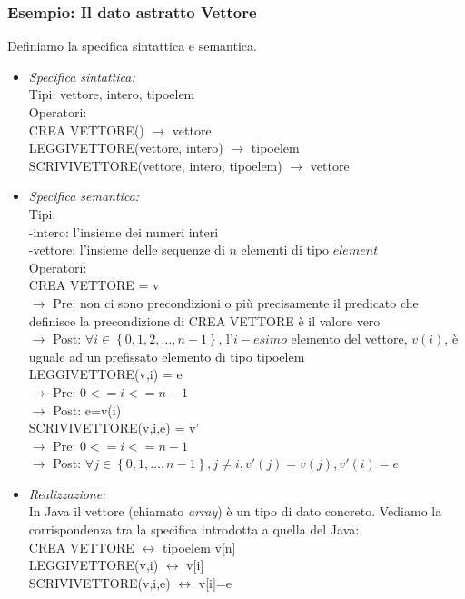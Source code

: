 \documentclass{article}
\begin{document}
	\subsubsection{Esempio: Il dato astratto Vettore}
	Definiamo la specifica sintattica e semantica.
	\begin{itemize}
		\item \textit{Specifica sintattica:} 
		\vspace{\baselineskip} \\
		Tipi: vettore, intero, tipoelem 
		\vspace{\baselineskip} \\
		Operatori:\\
		CREA VETTORE() $\rightarrow$ vettore \\
		LEGGIVETTORE(vettore, intero) $\rightarrow$ tipoelem \\
		SCRIVIVETTORE(vettore, intero, tipoelem) $\rightarrow$ vettore 
		\item \textit{Specifica semantica:} 
		\vspace{\baselineskip} \\
		Tipi: \\
		-intero: l'insieme dei numeri interi \\
		-vettore: l'insieme delle sequenze di $n$ elementi di tipo $element$ 
		\vspace{\baselineskip} \\
		Operatori: 
		\vspace{\baselineskip} \\
		CREA VETTORE = v \\
		$\rightarrow$ Pre: non ci sono precondizioni o più precisamente il predicato che definisce la precondizione di CREA VETTORE è il valore vero \\
		$\rightarrow$ Post: $\forall i \in \left\{0,1,2, \ldots, n-1\right\}$, l'$i-esimo$ elemento del vettore, $v(i)$, è uguale ad un prefissato elemento di tipo tipoelem
		\vspace{\baselineskip} \\
		LEGGIVETTORE(v,i) = e \\
		$\rightarrow$ Pre: $0 <= i <= n-1$ \\
		$\rightarrow$ Post: e=v(i)
		\vspace{\baselineskip} \\
		SCRIVIVETTORE(v,i,e) = v' \\
		$\rightarrow$ Pre: $0 <= i <= n-1$ \\
		$\rightarrow$ Post: $\forall j \in 
		\left\{0,1, \ldots, n-1\right\}, j \neq i, v'(j)=v(j), v'(i)=e$
		\item \textit{Realizzazione:} 
		\vspace{\baselineskip} \\
		In Java il vettore (chiamato \textit{array}) è un tipo di dato concreto. Vediamo la corrispondenza tra la specifica introdotta a quella del Java: \\
		
		CREA VETTORE $\leftrightarrow$ tipoelem v[n] \\
		LEGGIVETTORE(v,i) $\leftrightarrow$ v[i] \\
		SCRIVIVETTORE(v,i,e) $\leftrightarrow$ v[i]=e
	\end{itemize}
\end{document}

